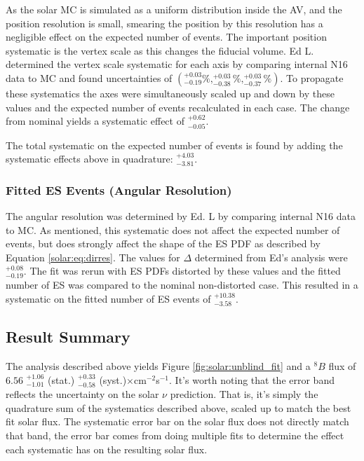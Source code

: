 As the solar MC is simulated as a uniform distribution inside the AV, and the
position resolution is small, smearing the position by this resolution has a 
negligible effect on the expected number of events.
The important position systematic is the vertex scale as this changes the 
fiducial volume.
Ed L. determined the vertex scale systematic for each axis by comparing
internal N16 data to MC and found uncertainties of
$(^{+0.03}_{-0.19}\%,^{+0.03}_{-0.38}\%,^{+0.03}_{-0.37}\%)$.
To propagate these systematics the axes were simultaneously scaled up and down
by these values and the expected number of events recalculated in each case.
The change from nominal yields a systematic effect of $^{+0.62}_{-0.05}$.

The total systematic on the expected number of events is found by adding the
systematic effects above in quadrature: $^{+4.03}_{-3.81}$.

\subsubsection{Fitted ES Events (Angular Resolution)}

The angular resolution was determined by Ed. L by comparing internal N16 
data to MC. As mentioned, this systematic does not affect the expected 
number of events, but does strongly affect the shape of the ES PDF as 
described by Equation \ref{solar:eq:dirres}.
The values for $\Delta$ determined from Ed's analysis were $^{+0.08}_{-0.19}$.
The fit was rerun with ES PDFs distorted by these values and the fitted 
number of ES was compared to the nominal non-distorted case.
This resulted in a systematic on the fitted number of ES events of 
$^{+10.38}_{-3.58}$.

\subsection{Result Summary}

The analysis described above yields Figure \ref{fig:solar:unblind_fit} and a 
$^8B$ flux of
$6.56$ $^{+1.06}_{-1.01}$ (stat.) $^{+0.33}_{-0.58}$ (syst.)$\times$cm$^{-2}$s$^{-1}$.
It's worth noting that the error band reflects the uncertainty on the solar
$\nu$ prediction.
That is, it's simply the quadrature sum of the systematics described above,
scaled up to match the best fit solar flux.
The systematic error bar on the solar flux does not directly match that band,
the error bar comes from doing multiple fits to determine the effect each systematic
has on the resulting solar flux.

